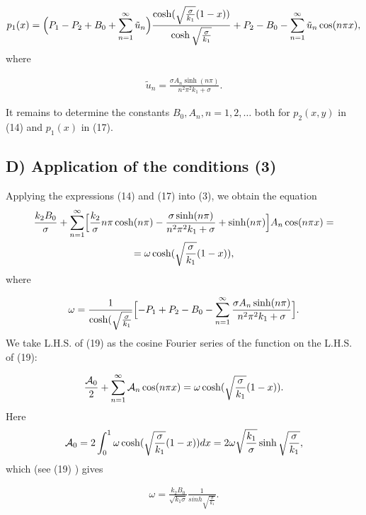 \documentclass[times]{nlaauth}%
\begin{document}
\begin {gather}
p_1(x)  = \Bigl(P_1 -P_2 + B_0  
+\sum^{\infty}_{n=1} \tilde u_n \Bigr) \frac{\cosh({\sqrt{\frac{\sigma}{k_1}}(1-x))}}{\cosh\sqrt{\frac{\sigma}{k_1}}}
+P_2 - B_0 - \sum^{\infty}_{n=1} \tilde u_n \cos (n\pi x),
\end {gather}
where 

\begin {gather}
\tilde u_n = \frac{\sigma A_n \sinh(n\pi)}{n^2\pi^2 k_1 + \sigma}  .
\end {gather}

It remains to determine the constants $B_0, A_n , n=1, 2, \dots$
both for $p_2(x,y)$ in (14) and $p_1(x)$ in (17).


\subsection {D) Application of the conditions (3)}

Applying the expressions (14) and (17) into (3), we obtain the equation
\begin {gather}
\frac{k_2 B_0}{\sigma} 
+\sum^{\infty}_{n=1} \Bigl[ \frac{k_2}{\sigma} n\pi \cosh(n\pi) -\frac{\sigma \sinh(n\pi)}{n^2\pi^2 k_1 + \sigma}  
+ \sinh(n \pi) \Bigr] A_n \cos(n\pi x) = \nonumber \\
= \omega \cosh(\sqrt{\frac{\sigma}{k_1}}(1-x)) ,
\end {gather}
where 

\begin {gather}
\omega = \frac{1}{\cosh(\sqrt{\frac{\sigma}{k_1}}} \Bigl[
-P_1+P_2 -B_0 - \sum^{\infty}_{n=1} \frac{\sigma A_n \sinh(n\pi)}{n^2\pi^2 k_1 + \sigma}  
\Bigr].
\end {gather}
We take L.H.S. of (19) as the cosine Fourier series of the function on the L.H.S. of (19):



\begin {gather}
\frac{{\cal A}_0}{2} + \sum^{\infty}_{n=1} {\cal A}_n \cos (n\pi x) = \omega \cosh(\sqrt{\frac{\sigma}{k_1}}(1-x)) .
\end {gather}
Here 
\begin {gather}
{\cal A}_0 = 2 \int _0^1 \omega \cosh(\sqrt{\frac{\sigma}{k_1}}(1-x)) dx =
2\omega \sqrt {\frac{k_1}{\sigma}}\sinh \sqrt{\frac{\sigma}{k_1}}, \nonumber
\end {gather}
which (see (19) ) gives 


\begin {gather}
\omega = \frac{k_2 B_0}{\sqrt{k_1 \sigma}}\frac {1}{sinh \sqrt{\frac{\sigma}{k_1}}} .
\end {gather}
\end{document}
